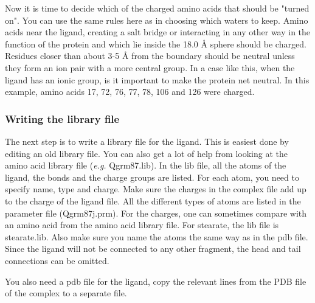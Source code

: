 \documentclass[a4paper,11pt]{article}
\begin{document}
Now it is time to decide which  of the charged amino acids that should
be "turned on". You  can use the same rules here  as in choosing which
waters to keep.  Amino acids near the ligand, creating  a salt bridge
or interacting  in any other  way in the  function of the  protein and
which lie  inside the  18.0 {\AA} sphere  should be  charged. Residues
closer than about 3-5 {\AA} from the boundary should be neutral unless
they form an ion pair with a  more central group. In a case like this,
when  the ligand  has an  ionic  group, is  it important  to make  the
protein net neutral. In this example,  amino acids 17, 72, 76, 77, 78,
106 and 126 were charged. 

\subsubsection{Writing the library file}
The next  step is  to write  a library  file for  the ligand.  This is
easiest done by editing an old library file. You can also get a lot of
help  from  looking at  the  amino  acid library  file  (\textit{e.g.}
Qgrm87.lib). In the  lib file, all the atoms of  the ligand, the bonds
and the charge  groups are listed. For each atom,  you need to specify
name, type and  charge. Make sure the charges in  the complex file add
up to the charge of the ligand  file. All the different types of atoms
are listed in  the parameter file (Qgrm87j.prm). For  the charges, one
can sometimes compare  with an amino acid from the  amino acid library
file. For stearate,  the lib file is stearate.lib. Also  make sure you
name the atoms the same way as  in the pdb file. Since the ligand will
not be connected to any other  fragment, the head and tail connections
can be omitted.

You also need a pdb file for  the ligand, copy the relevant lines from
the PDB file of the complex to a separate file.
\end{document}
